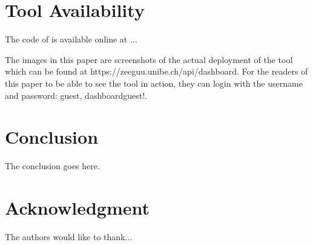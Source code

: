 \documentclass[conference]{IEEEtran}
\begin{document}
\section{Tool Availability}

The code of \tool is available online at ...

The images in this paper are screenshots of the actual deployment of the tool which can be found at {https://zeeguu.unibe.ch/api/dashboard}. For the readers of this paper to be able to see the tool in action, they can login with the username and password: guest, dashboardguest!. 

\section{Conclusion}
The conclusion goes here.






\section*{Acknowledgment}


The authors would like to thank...










\end{document}

